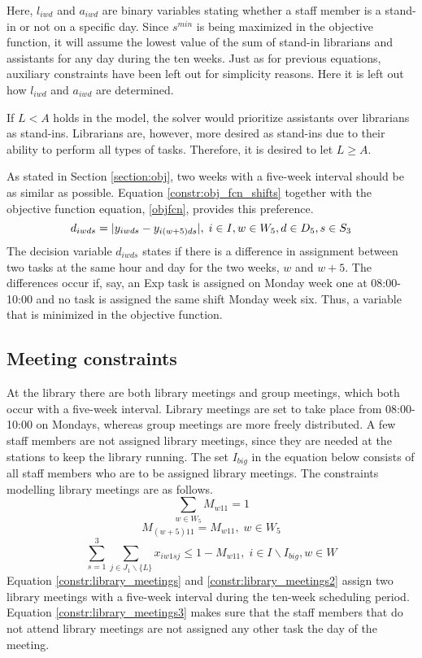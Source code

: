 Here, $l_{iwd}$ and $a_{iwd}$ are binary variables stating whether a staff member is a stand-in or not on a specific day. Since $s^{min}$ is being maximized in the objective function, it will assume the lowest value of the sum of stand-in librarians and assistants for any day during the ten weeks. Just as for previous equations, auxiliary constraints have been left out for simplicity reasons. Here it is left out how $l_{iwd}$ and $a_{iwd}$ are determined.

If $L < A$ holds in the model, the solver would prioritize assistants over librarians as stand-ins. Librarians are, however, more desired as stand-ins due to their ability to perform all types of tasks. Therefore, it is desired to let $L \geq A$.

As stated in Section \ref{section:obj}, two weeks with a five-week interval should be as similar as possible. Equation \ref{constr:obj_fcn_shifts} together with the objective function equation, \ref{objfcn}, provides this preference.
\begin{equation} \label{constr:obj_fcn_shifts}
d_{iwds} = \lvert y_{iwds} - y_{i(w+5)ds}\rvert, \;   i \in I, w \in W_5, d \in D_5, s \in S_3
\end{equation}
The decision variable $d_{iwds}$ states if there is a difference in assignment between two tasks at the same hour and day for the two weeks, $w$ and $w+5$. The differences occur if, say, an Exp task is assigned on Monday week one at 08:00-10:00 and no task is assigned the same shift Monday week six. Thus, a variable that is minimized in the objective function.

\subsection{Meeting constraints} \label{section:meeting_constraints}
At the library there are both library meetings and group meetings, which both occur with a five-week interval. Library meetings are set to take place from 08:00-10:00 on Mondays, whereas group meetings are more freely distributed. A few staff members are not assigned library meetings, since they are needed at the stations to keep the library running. The set $I_{big}$ in the equation below consists of all staff members who are to be assigned library meetings. The constraints modelling library meetings are as follows.
\begin{equation} \label{constr:library_meetings}
\sum_{w \in W_5} M_{w11} = 1
\end{equation}
\begin{equation} \label{constr:library_meetings2}
M_{(w+5)11} = M_{w11}, \;   w \in W_5
\end{equation}
\begin{equation} \label{constr:library_meetings3}
\sum_{s=1}^{3} \sum_{j \in J_1 \backslash \{L\}} x_{iw1sj} \leq 1-M_{w11}, \;   i \in I \backslash I_{big}, w \in W
\end{equation}
Equation \ref{constr:library_meetings} and \ref{constr:library_meetings2} assign two library meetings with a five-week interval during the ten-week scheduling period. Equation \ref{constr:library_meetings3} makes sure that the staff members that do not attend library meetings are not assigned any other task the day of the meeting.

